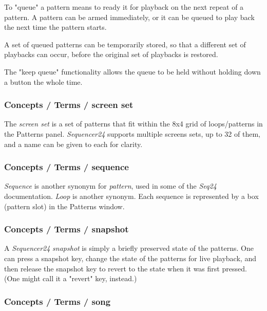    To "queue" a pattern means to ready it for playback on the next repeat of
   a pattern.  A pattern can be armed immediately, or it can be queued to
   play back the next time the pattern starts.

   A set of queued patterns can be temporarily stored, so that a different
   set of playbacks can occur, before the original set of playbacks is
   restored.

   The "keep queue" functionality allows the queue to be held without
   holding down a button the whole time.

\subsubsection{Concepts / Terms / screen set}
\label{subsubsec:concepts_terms_screen_set}

   The \textsl{screen set}
   is a set of patterns that fit within the 8x4 grid of loops/patterns in the
   Patterns panel.
   \textsl{Sequencer24} supports multiple screens sets, up to 32 of them,
   and a name can be given to each for clarity.

\subsubsection{Concepts / Terms / sequence}
\label{subsubsec:concepts_terms_sequence}

   \textsl{Sequence} is
   another synonym for \textsl{pattern}, used in some of the \textsl{Seq24}
   documentation.  \textsl{Loop} is another synonym.
   Each sequence is represented by a box (pattern slot) in the Patterns window.

\subsubsection{Concepts / Terms / snapshot}
\label{subsubsec:concepts_terms_snapshot}

   A \textsl{Sequencer24} \textsl{snapshot} is simply a briefly preserved
   state of the patterns.  One can press a snapshot key, change the state of
   the patterns for live playback, and then release the snapshot key to
   revert to the state when it was first pressed.  (One might call it a
   "revert" key, instead.)

\subsubsection{Concepts / Terms / song}
\label{subsubsec:concepts_terms_song}


